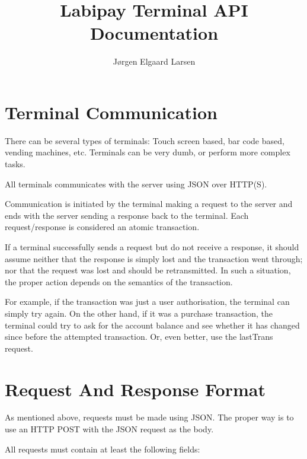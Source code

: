 \documentclass[a4paper,11pt]{article}
\title{Labipay Terminal API Documentation}
\author{Jørgen Elgaard Larsen}
\newcommand{\code}[1]
   {\textsf{\mbox{#1}}}
\begin{document}
\maketitle

\section{Terminal Communication}
There can be several types of terminals: Touch screen based, bar code based,
vending machines, etc. Terminals can be very dumb, or perform more complex tasks. 

All terminals communicates with the server using JSON over HTTP(S). 

Communication is initiated by the terminal making a request to the
server and ends with the server sending a response back to the terminal. Each
request/response is considered an atomic transaction.

If a terminal successfully sends a request but do not receive a response, it
should assume neither that the response is simply lost and the transaction
went through; nor that the request was lost and should be
retransmitted. In such a situation, the proper action depends on the semantics
of the transaction.

For example, if the transaction was just a user authorisation, the terminal
can simply try again. On the other hand, if it was a purchase transaction, the
terminal could try to ask for the account balance and see whether it has
changed since before the attempted transaction. Or, even better, use
the \code{lastTrans} request.


\section{Request And Response Format}\label{sec:rrFormat}

As mentioned above, requests must be made using JSON. The proper way is to use
an HTTP POST with the JSON request as the body.

All requests must contain at least the following fields:
\end{document}
